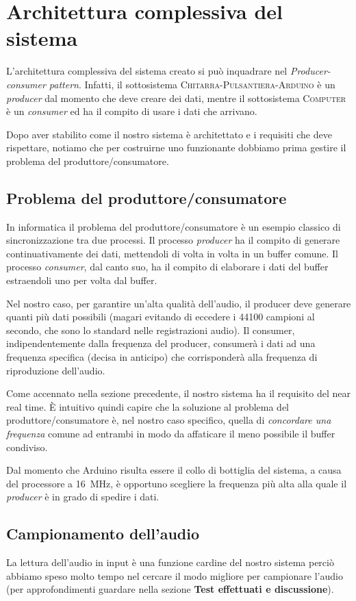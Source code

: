 \documentclass[a4paper,11pt]{article}
\begin{document}
\section{Architettura complessiva del sistema}
L'architettura complessiva del sistema creato si può inquadrare nel \textit{Producer-consumer pattern}. Infatti, il sottosistema \textsc{Chitarra-Pulsantiera-Arduino} è un \textit{producer} dal momento che deve creare dei dati, mentre il sottosistema \textsc{Computer} è un \textit{consumer} ed ha il compito di usare i dati che arrivano.

Dopo aver stabilito come il nostro sistema è architettato e i requisiti che deve rispettare, notiamo che per costruirne uno funzionante dobbiamo prima gestire il problema del produttore/consumatore.

\subsection{Problema del produttore/consumatore}
In informatica il problema del produttore/consumatore è un esempio classico di sincronizzazione tra due processi. Il processo \textit{producer} ha il compito di generare continuativamente dei dati, mettendoli di volta in volta in un buffer comune. Il processo \textit{consumer}, dal canto suo, ha il compito di elaborare i dati del buffer estraendoli uno per volta dal buffer.

Nel nostro caso, per garantire un'alta qualità dell'audio, il producer deve generare quanti più dati possibili (magari evitando di eccedere i \num{44100} campioni al secondo, che sono lo standard nelle registrazioni audio). Il consumer, indipendentemente dalla frequenza del producer, consumerà i dati ad una frequenza specifica (decisa in anticipo) che corrisponderà alla frequenza di riproduzione dell'audio.

Come accennato nella sezione precedente, il nostro sistema ha il requisito del near real time. È intuitivo quindi capire che la soluzione al problema del produttore/consumatore è, nel nostro caso specifico, quella di \textit{concordare una frequenza} comune ad entrambi in modo da affaticare il meno possibile il buffer condiviso.

Dal momento che Arduino risulta essere il collo di bottiglia del sistema, a causa del processore a \SI{16}{\mega\hertz}, è opportuno scegliere la frequenza più alta alla quale il \textit{producer} è in grado di spedire i dati.

\subsection{Campionamento dell'audio}
La lettura dell'audio in input è una funzione cardine del nostro sistema perciò abbiamo speso molto tempo nel cercare il modo migliore per campionare l'audio (per approfondimenti guardare nella sezione \textbf{Test effettuati e discussione}).
\end{document}
